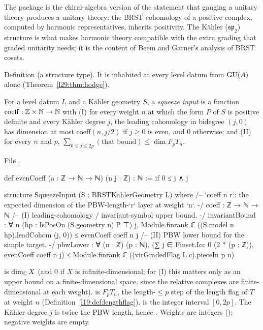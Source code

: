 \begin{physics}
The package is the chiral-algebra version of the statement that gauging a unitary theory produces a unitary theory:
the BRST cohomology of a positive complex, computed by harmonic representatives, inherits positivity. The Kähler
($\mathfrak{sp}_2$) structure is what makes harmonic theory compatible with the extra grading that graded unitarity
needs; it is the content of Beem and Garner's analysis of BRST cosets.
\end{physics}

\begin{status}
Definition (a structure type). It is inhabited at every level datum from $\mathrm{GU}(A)$ alone
(Theorem~\ref{l29:thm:hodge}).
\end{status}

\begin{definition}\label{l29:def:squeeze}
For a level datum $L$ and a Kähler geometry $S$, a \emph{squeeze input} is a function
$\mathrm{coeff}:{\mathbb{Z}}\times{\mathbb{N}}\to{\mathbb{N}}$ with (I) for every weight $n$ at which the form $P$ of $S$ is positive definite and every
Kähler degree $j$, the leading cohomology in
bidegree $(j,0)$ has dimension at most $\mathrm{coeff}(n,j/2)$ if $j\ge0$ is even, and $0$ otherwise; and (II) for every
$n$ and $p$, $\sum_{0\le j\le 2p}(\text{that bound})\le\dim F_pT_n$.
\end{definition}

\noindent File .
\begin{leancode}
def evenCoeff (a : ℤ → ℕ → ℕ) (n j : ℤ) : ℕ :=
  if 0 ≤ j ∧ j %

structure SqueezeInput (S : BRSTKahlerGeometry L) where
  /-- `coeff n r`: the expected dimension of the PBW-length-`r` layer at weight `n`. -/
  coeff : ℤ → ℕ → ℕ
  /-- (I) leading-cohomology / invariant-symbol upper bound. -/
  invariantBound : ∀ n (hp : IsPosOn (S.geometry n).P ⊤) j,
    Module.finrank ℂ ((S.model n hp).leadCohom (j, 0)) ≤ evenCoeff coeff n j
  /-- (II) PBW lower bound for the simple target. -/
  pbwLower : ∀ (n : ℤ) (p : ℕ),
    (∑ j ∈ Finset.Icc 0 (2 * (p : ℤ)), evenCoeff coeff n j) ≤
      Module.finrank ℂ ((virGradedFlag L.c).pieceIn p n)
\end{leancode}

\begin{dictionary}
 is $\dim_{\mathbb{C}} X$ (and $0$ if $X$ is infinite-dimensional; for (I) this matters only as an
upper bound on a finite-dimensional space, since the relative complexes are finite-dimensional at each weight).
 is $F_pT_n$, the length-$\le p$ step of the length flag of $T$ at weight $n$
(Definition~\ref{l19:def:lengthflag}).  is the integer interval $[0,2p]$. The Kähler degree
$j$ is twice the PBW length, hence . Weights are integers (); negative weights are empty.
\end{dictionary}

